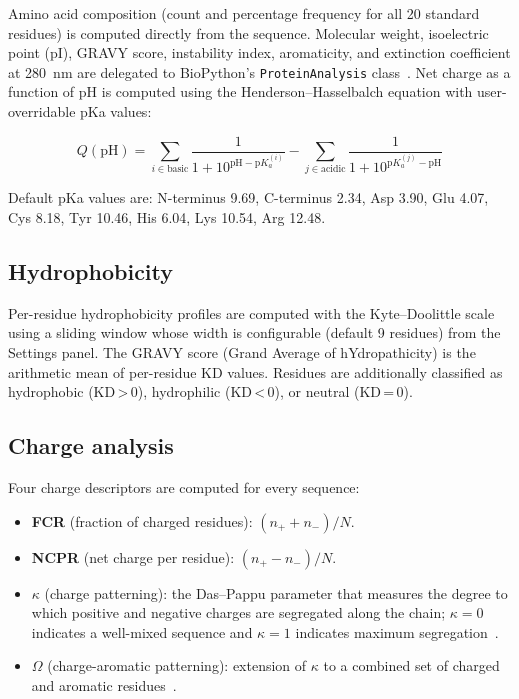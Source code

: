 \documentclass[12pt]{article}
\begin{document}
Amino acid composition (count and percentage frequency for all 20 standard
residues) is computed directly from the sequence.
Molecular weight, isoelectric point (pI), GRAVY score, instability index,
aromaticity, and extinction coefficient at 280~nm are delegated to BioPython's
\texttt{ProteinAnalysis} class~\citep{cock2009}.
Net charge as a function of pH is computed using the Henderson--Hasselbalch
equation with user-overridable pKa values:

\begin{equation}
Q(\mathrm{pH}) =
  \sum_{i \in \text{basic}} \frac{1}{1 + 10^{\mathrm{pH} - \mathrm{p}K_a^{(i)}}}
  - \sum_{j \in \text{acidic}} \frac{1}{1 + 10^{\mathrm{p}K_a^{(j)} - \mathrm{pH}}}
\end{equation}

Default pKa values are: N-terminus 9.69, C-terminus 2.34, Asp 3.90, Glu 4.07,
Cys 8.18, Tyr 10.46, His 6.04, Lys 10.54, Arg 12.48.

\subsection{Hydrophobicity}

Per-residue hydrophobicity profiles are computed with the Kyte--Doolittle
scale~\citep{kyte1982} using a sliding window whose width is configurable
(default 9 residues) from the Settings panel.
The GRAVY score (Grand Average of hYdropathicity) is the arithmetic mean of
per-residue KD values.
Residues are additionally classified as hydrophobic (KD\,>\,0),
hydrophilic (KD\,<\,0), or neutral (KD\,=\,0).

\subsection{Charge analysis}

Four charge descriptors are computed for every sequence:

\begin{itemize}[noitemsep]
  \item \textbf{FCR} (fraction of charged residues): $(n_+ + n_-) / N$.
  \item \textbf{NCPR} (net charge per residue): $(n_+ - n_-) / N$.
  \item \textbf{$\kappa$} (charge patterning): the Das--Pappu parameter that
        measures the degree to which positive and negative charges are
        segregated along the chain; $\kappa = 0$ indicates a well-mixed
        sequence and $\kappa = 1$ indicates maximum segregation~\citep{das2013}.
  \item \textbf{$\Omega$} (charge-aromatic patterning): extension of $\kappa$
        to a combined set of charged and aromatic residues~\citep{das2015}.
\end{itemize}
\end{document}
